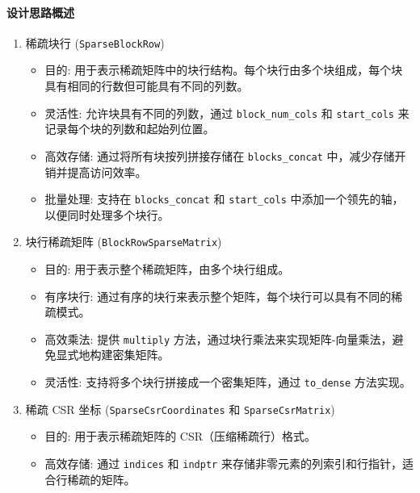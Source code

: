 \documentclass{ctexart}
\begin{document}
\paragraph{设计思路概述}

\begin{enumerate}
	\item 稀疏块行 (\texttt{SparseBlockRow})

	      \begin{itemize}
		      \item 目的: 用于表示稀疏矩阵中的块行结构。每个块行由多个块组成，每个块具有相同的行数但可能具有不同的列数。

		      \item 灵活性: 允许块具有不同的列数，通过 \texttt{block\_num\_cols} 和 \texttt{start\_cols} 来记录每个块的列数和起始列位置。

		      \item 高效存储: 通过将所有块按列拼接存储在 \texttt{blocks\_concat} 中，减少存储开销并提高访问效率。

		      \item 批量处理: 支持在 \texttt{blocks\_concat} 和 \texttt{start\_cols} 中添加一个领先的轴，以便同时处理多个块行。
	      \end{itemize}
	\item 块行稀疏矩阵 (\texttt{BlockRowSparseMatrix})

	      \begin{itemize}
		      \item 目的: 用于表示整个稀疏矩阵，由多个块行组成。

		      \item 有序块行: 通过有序的块行来表示整个矩阵，每个块行可以具有不同的稀疏模式。

		      \item 高效乘法: 提供 \texttt{multiply} 方法，通过块行乘法来实现矩阵-向量乘法，避免显式地构建密集矩阵。

		      \item 灵活性: 支持将多个块行拼接成一个密集矩阵，通过 \texttt{to\_dense} 方法实现。
	      \end{itemize}

	\item 稀疏 CSR 坐标 (\texttt{SparseCsrCoordinates} 和 \texttt{SparseCsrMatrix})

	      \begin{itemize}
		      \item 目的: 用于表示稀疏矩阵的 CSR（压缩稀疏行）格式。

		      \item 高效存储: 通过 \texttt{indices} 和 \texttt{indptr} 来存储非零元素的列索引和行指针，适合行稀疏的矩阵。


\end{itemize}
\end{enumerate}
\end{document}
